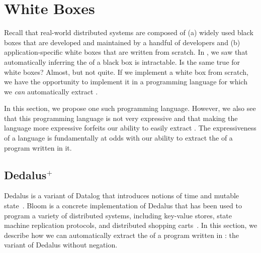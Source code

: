 \newcommand{\dedalusplus}{Dedalus$^+$}

\section{White Boxes}
Recall that real-world distributed systems are composed of (a) widely used
black boxes that are developed and maintained by a handful of developers and
(b) application-specific white boxes that are written from scratch. In
, we saw that automatically inferring the \watprovenance{}
of a black box is intractable. Is the same true for white boxes? Almost, but
not quite. If we implement a white box from scratch, we have the opportunity to
implement it in a programming language for which we \emph{can} automatically
extract \watprovenance{}.

In this section, we propose one such programming language. However, we also see
that this programming language is not very expressive and that making the
language more expressive forfeits our ability to easily extract
\watprovenance{}. The expressiveness of a language is fundamentally at odds
with our ability to extract the \watprovenance{} of a program written in it.

\subsection{\dedalusplus}
Dedalus is a variant of Datalog that introduces notions of time and mutable
state~\cite{alvaro2011dedalus, marczak2012confluence, alvaro2013declarative}.
Bloom is a concrete implementation of Dedalus that has been used to program a
variety of distributed systems, including key-value stores, state machine
replication protocols, and distributed shopping
carts~\cite{alvaro2011consistency, conway2012logic}. In this section, we
describe how we can automatically extract the \watprovenance{} of a program
written in \defword{\dedalusplus}: the variant of Dedalus without negation.

{}

